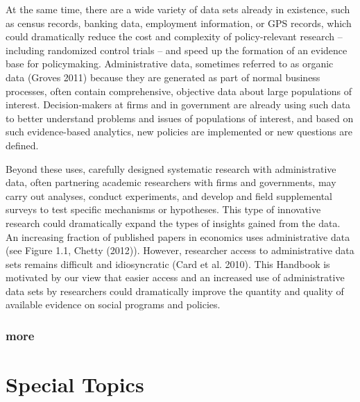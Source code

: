 \documentclass[11pt]{book}
\begin{document}
At the same time, there are a wide variety of data sets already in existence, such as census records, banking data, employment information, or GPS records, which could dramatically reduce the cost and complexity of policy-relevant research – including randomized control trials – and speed up the formation of an evidence base for policymaking. Administrative data, sometimes referred to as organic data (Groves 2011) because they are generated as part of normal business processes, often contain comprehensive, objective data about large populations of interest. Decision-makers at firms and in government are already using such data to better understand problems and issues of populations of interest, and based on such evidence-based analytics, new policies are implemented or new questions are defined.

Beyond these uses, carefully designed systematic research with administrative data, often partnering academic researchers with firms and governments, may carry out analyses, conduct experiments, and develop and field supplemental surveys to test specific mechanisms or hypotheses. This type of innovative research could dramatically expand the types of insights gained from the data. An increasing fraction of published papers in economics uses administrative data (see Figure 1.1, Chetty (2012)). However, researcher access to administrative data sets remains difficult and idiosyncratic (Card et al. 2010). This Handbook is motivated by our view that easier access and an increased use of administrative data sets by researchers could dramatically improve the quantity and quality of available evidence on social programs and policies.

\newpage
\section{more}

\hypertarget{part-special-topics}{%
\part*{Special Topics}\label{part-special-topics}}





\end{document}

